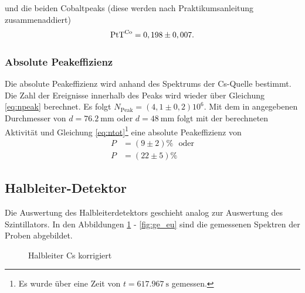 und die beiden Cobaltpeaks (diese werden nach Praktikumsanleitung zusammenaddiert)
\begin{align*}
 \text{PtT}^\mathrm{Co} = 0,198\pm 0,007.
\end{align*}

\subsubsection*{Absolute Peakeffizienz}
Die absolute Peakeffizienz wird anhand des Spektrums der Cs-Quelle bestimmt. Die Zahl der Ereignisse innerhalb des Peaks wird wieder über Gleichung \ref{eq:npeak} berechnet. Es folgt $N_\mathrm{Peak}=(4,1 \pm 0,2)10^6$. Mit dem in \cite{praktikumsheft} angegebenen Durchmesser von $d=\SI{76.2}{\milli\metre}$ oder $d=\SI{48}{\milli\metre}$ folgt mit der berechneten Aktivität und Gleichung \ref{eq:ntot}\footnote{Es wurde über eine Zeit von $t=\SI{617.967}{\second}$ gemessen.} eine absolute Peakeffizienz von
\begin{align*}
  P&=(9 \pm 2)\% \ \ \ \mathrm{oder}\\
  P&=(22 \pm 5)\%
\end{align*}

\subsection{Halbleiter-Detektor}
Die Auswertung des Halbleiterdetektors geschieht analog zur Auswertung des Szintillators. In den Abbildungen \ref{fig:ge_cs} - \ref{fig:ge_eu} sind die gemessenen Spektren der Proben abgebildet. 

\begin{figure}[h]
\centering
{}
\caption{Halbleiter Cs korrigiert}
\label{fig:ge_cs}
\end{figure}

